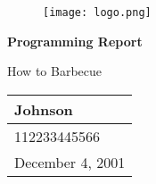 \documentclass[a4paper]{report}
\title{\PaperTitle}
\author{\StudentName \; \StudentNumber}
\date{}
\newcommand{\StudentNumber}{112233445566}  %
\newcommand{\StudentName}{Johnson}  %
\newcommand{\PaperTitle}{How to Barbecue}  %
\newcommand{\PaperType}{Programming Report} %
\newcommand{\Date}{December 4, 2001}
\begin{document}
	
\vspace*{1cm}

\begin{figure}[h]
	\centering
	\texttt{[image: logo.png]}
\end{figure}

\vspace*{1cm}

\begin{center}
	\Huge{\textbf{\PaperType}}
	
	\Large{\PaperTitle}
\end{center}

\vspace*{1cm}

\begin{table}[h]
	\centering	
	\begin{Large}
		\begin{tabular}{p{7cm}<{\centering}}
			\StudentName  \\
			\hline
			\StudentNumber \\
			\hline
			\Date  \\
			\hline
		\end{tabular}
	\end{Large}
\end{table}

\newpage
	
\tableofcontents 
\newpage
\end{document}
